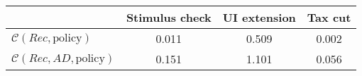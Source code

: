 \begin{tabular}{@{}lccc@{}} 
\toprule 
                          & Stimulus check      & UI extension    & Tax cut    \\  \midrule 
$\mathcal{C}(Rec,\text{policy})$ & 0.011  & 0.509  & 0.002     \\ 
$\mathcal{C}(Rec, AD,\text{policy})$ & 0.151  & 1.101  & 0.056     \\ 
\end{tabular}  
